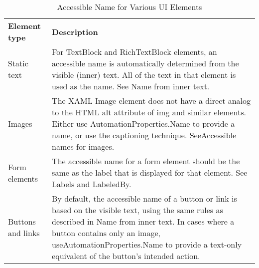 \begin{table}[htbp]
  \centering
  \caption{Accessible Name for Various UI Elements}
    \label{tab:accessibleNameWP8}%
    \renewcommand{\arraystretch}{1.2}
    \begin{tabularx}{\textwidth}{l|X}
    \rowcolor{mygray}
    \textbf{Element type} & \textbf{Description} \\
    Static text & For TextBlock and RichTextBlock elements, an accessible name is automatically determined from the visible (inner) text. All of the text in that element is used as the name. See Name from inner text. \\ \hline
    Images & The XAML Image element does not have a direct analog to the HTML alt attribute of img and similar elements. Either use AutomationProperties.Name to provide a name, or use the captioning technique. SeeAccessible names for images. \\ \hline
    Form elements & The accessible name for a form element should be the same as the label that is displayed for that element. See Labels and LabeledBy. \\ \hline
    Buttons and links & By default, the accessible name of a button or link is based on the visible text, using the same rules as described in Name from inner text. In cases where a button contains only an image, useAutomationProperties.Name to provide a text-only equivalent of the button's intended action. \\
    \end{tabularx}%
  \label{tab:accessibleNameWP82}%
\end{table}%
